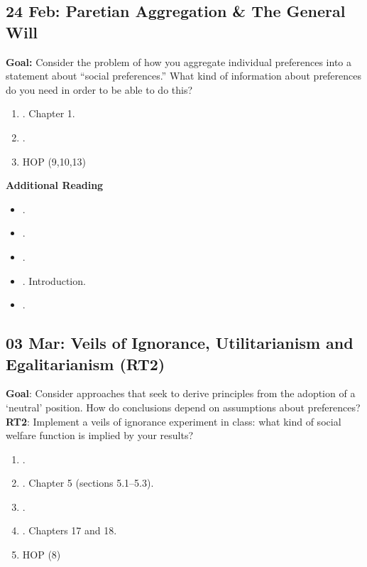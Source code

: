 \documentclass[11pt]{article}
\begin{document}
\subsection{24 Feb: Paretian Aggregation \& The General Will}
\textbf{Goal:} Consider the problem of how you aggregate individual preferences into a statement about ``social preferences.'' What kind of information about preferences do you need in order to be able to do this? 
\begin{enumerate}
\item {}. Chapter 1.
\item {}.
\item HOP (9,10,13)
\end{enumerate}

\textbf{Additional Reading}
\begin{itemize}
\item {}.
\item {}.
\item {}.
\item {}. Introduction.
\item {}.
\end{itemize}


\subsection{03 Mar: Veils of Ignorance, Utilitarianism and Egalitarianism (RT2)}
\textbf{Goal}: Consider approaches that seek to derive principles from the adoption of a `neutral' position. How do conclusions depend on assumptions about preferences?  \textbf{RT2}: Implement a veils of ignorance experiment in class: what kind of social welfare function is implied by your results?
\begin{enumerate}
\item {}.
\item {}. Chapter 5 (sections 5.1--5.3).
\item {}.
\item {}. Chapters 17 and 18.
\item HOP (8)
\end{enumerate}
\end{document}
